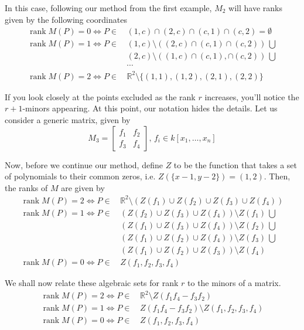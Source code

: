 \documentclass{amsart}
\theoremstyle{definition}
\theoremstyle{remark}
\DeclareMathOperator{\rank}{rank}
\numberwithin{equation}{section}
\begin{document}
In this case, following our method from the first example, $M_2$ will have ranks given by the following coordinates
\begin{align*}
  \rank M(P) = 0 \iff P \in &\, (1, c) \cap (2, c) \cap (c, 1) \cap (c, 2) = \emptyset\\
  \rank M(P) = 1 \iff P \in &\, (1, c) \setminus ((2, c) \cap (c, 1) \cap (c, 2)) \, \bigcup \\
  &\, (2, c) \setminus ((1, c) \cap (c, 1), \cap (c, 2)) \, \bigcup\\
  &\, \cdots\\
  \rank M(P) = 2 \iff P \in &\, \mathbb{R}^2 \setminus \{ (1, 1), (1, 2), (2, 1), (2, 2) \}
\end{align*}

If you look closely at the points excluded as the rank $r$ increases, you'll notice the $r + 1$-minors appearing. At this point, our notation hides the details. Let us consider a generic matrix, given by
\begin{equation}
  \label{eq:introduction-generic-matrix}
  M_3 = \begin{bmatrix}
    f_1 & f_2\\
    f_3 & f_4
  \end{bmatrix}
  \text{, } f_i \in k[x_1, \ldots, x_n]
\end{equation}

Now, before we continue our method, define $Z$ to be the function that takes a set of polynomials to their common zeros, i.e. $Z(\{ x - 1, y - 2 \}) = (1, 2)$. Then, the ranks of $M$ are given by
\begin{align*}
  \rank M(P) = 2 \iff P \in &\, \mathbb{R}^2 \setminus \left( Z(f_1) \cup Z(f_2) \cup Z(f_3) \cup Z(f_4) \right)\\
  \rank M(P) = 1 \iff P \in &\,  \left( Z(f_2) \cup Z(f_3) \cup Z(f_4) \right) \setminus Z(f_1) \, \bigcup \\
  &\, \left( Z(f_1) \cup Z(f_3) \cup Z(f_4) \right) \setminus Z(f_2) \, \bigcup\\
  &\, \left( Z(f_1) \cup Z(f_2) \cup Z(f_4) \right) \setminus Z(f_3) \, \bigcup\\
  &\, \left( Z(f_1) \cup Z(f_2) \cup Z(f_3) \right) \setminus Z(f_4)\\
  \rank M(P) = 0 \iff P \in &\, Z(f_1, f_2, f_3, f_4)
\end{align*}

We shall now relate these algebraic sets for rank $r$ to the minors of a matrix.
\begin{align}
  \rank M(P) = 2 \iff P \in &\, \mathbb{R}^2 \setminus Z(f_1f_4 - f_3f_2)\\
  \rank M(P) = 1 \iff P \in &\, Z(f_1f_4 - f_3f_2) \setminus Z(f_1 , f_2, f_3, f_4)\\
  \rank M(P) = 0 \iff P \in &\, Z(f_1, f_2, f_3, f_4)
\end{align}
\end{document}
